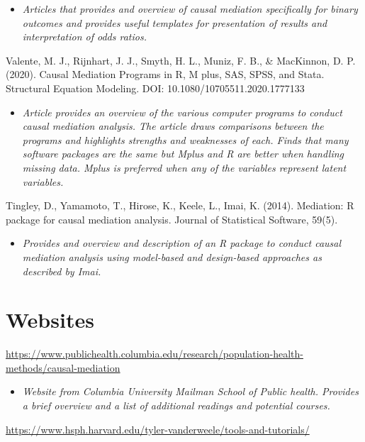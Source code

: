 \documentclass[
]{book}
\providecommand{\tightlist}{%
  \setlength{\itemsep}{0pt}\setlength{\parskip}{0pt}}
\begin{document}
\begin{itemize}
\tightlist
\item
  \emph{Articles that provides and overview of causal mediation specifically for binary outcomes and provides useful templates for presentation of results and interpretation of odds ratios.}
\end{itemize}

Valente, M. J., Rijnhart, J. J., Smyth, H. L., Muniz, F. B., \& MacKinnon, D. P. (2020). Causal Mediation Programs in R, M plus, SAS, SPSS, and Stata. Structural Equation Modeling. DOI: 10.1080/10705511.2020.1777133

\begin{itemize}
\tightlist
\item
  \emph{Article provides an overview of the various computer programs to conduct causal mediation analysis. The article draws comparisons between the programs and highlights strengths and weaknesses of each. Finds that many software packages are the same but Mplus and R are better when handling missing data. Mplus is preferred when any of the variables represent latent variables.}
\end{itemize}

Tingley, D., Yamamoto, T., Hirose, K., Keele, L., Imai, K. (2014). Mediation: R package for causal mediation analysis. Journal of Statistical Software, 59(5).

\begin{itemize}
\tightlist
\item
  \emph{Provides and overview and description of an R package to conduct causal mediation analysis using model-based and design-based approaches as described by Imai.}
\end{itemize}

\hypertarget{websites-3}{%
\section{Websites}\label{websites-3}}

\url{https://www.publichealth.columbia.edu/research/population-health-methods/causal-mediation}

\begin{itemize}
\tightlist
\item
  \emph{Website from Columbia University Mailman School of Public health. Provides a brief overview and a list of additional readings and potential courses.}
\end{itemize}

\url{https://www.hsph.harvard.edu/tyler-vanderweele/tools-and-tutorials/}
\end{document}

